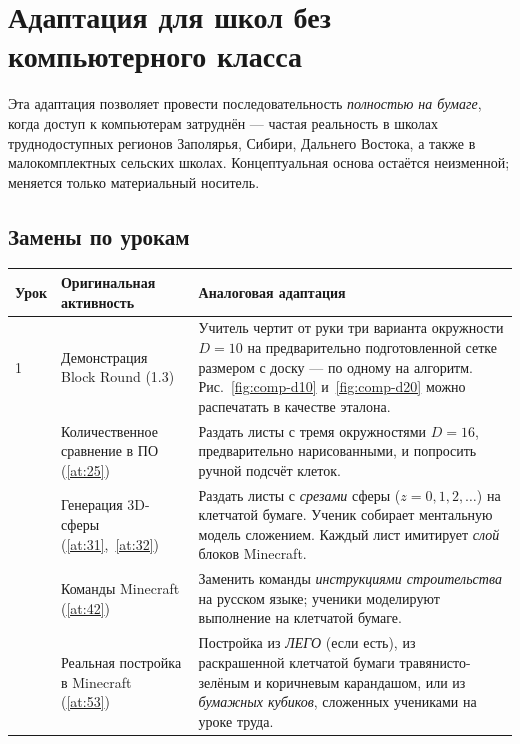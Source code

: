 \documentclass[12pt,a4paper]{scrartcl}
\begin{document}
\section{Адаптация для школ без компьютерного класса}\label{ap:adapt-analog}

Эта адаптация позволяет провести последовательность \emph{полностью на бумаге}, когда доступ к компьютерам затруднён --- частая реальность в школах труднодоступных регионов Заполярья, Сибири, Дальнего Востока, а также в малокомплектных сельских школах. Концептуальная основа остаётся неизменной; меняется только материальный носитель.

\subsection{Замены по урокам}

\begin{center}
\small
\begin{tabularx}{\textwidth}{@{}p{}p{}X@{}}
\toprule
\textbf{Урок} & \textbf{Оригинальная активность} & \textbf{Аналоговая адаптация} \\
\midrule
1 & Демонстрация Block Round (1.3) & Учитель чертит от руки три варианта окружности $D = 10$ на предварительно подготовленной сетке размером с доску --- по одному на алгоритм. Рис.~\ref{fig:comp-d10} и~\ref{fig:comp-d20} можно распечатать в качестве эталона. \\
\addlinespace[3pt]
2 & Количественное сравнение в ПО (\ref{at:25}) & Раздать листы с тремя окружностями $D = 16$, предварительно нарисованными, и попросить ручной подсчёт клеток. \\
\addlinespace[3pt]
3 & Генерация 3D-сферы (\ref{at:31},~\ref{at:32}) & Раздать листы с \emph{срезами} сферы ($z = 0, 1, 2, \ldots$) на клетчатой бумаге. Ученик собирает ментальную модель сложением. Каждый лист имитирует \emph{слой} блоков Minecraft. \\
\addlinespace[3pt]
4 & Команды Minecraft (\ref{at:42}) & Заменить команды \emph{инструкциями строительства} на русском языке; ученики моделируют выполнение на клетчатой бумаге. \\
\addlinespace[3pt]
5 & Реальная постройка в Minecraft (\ref{at:53}) & Постройка из \emph{ЛЕГО} (если есть), из раскрашенной клетчатой бумаги травянисто-зелёным и коричневым карандашом, или из \emph{бумажных кубиков}, сложенных учениками на уроке труда. \\
\bottomrule
\end{tabularx}
\end{center}
\end{document}
